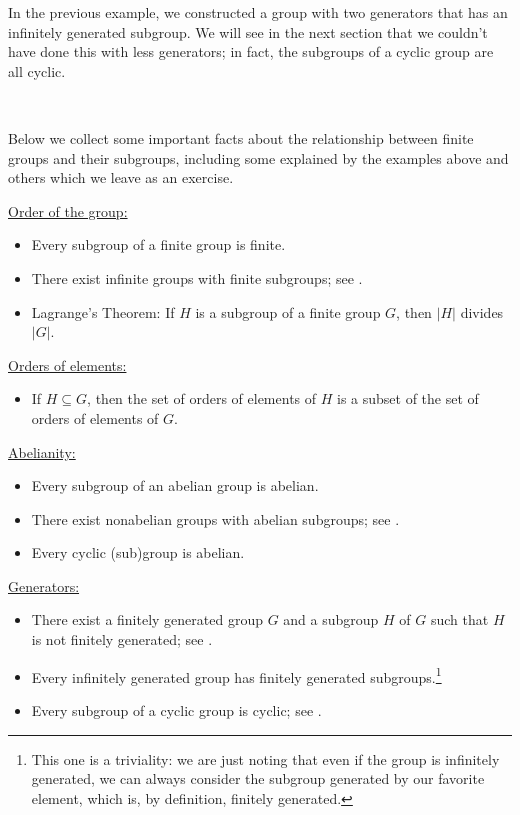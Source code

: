 \documentclass[12pt]{report}
\numberwithin{equation}{section}
\numberwithin{theorem}{chapter}
\theoremstyle{definition}
\newtheorem*{basic properties}{Basic Properties}
\newtheorem*{Important Remark}{Important Remark}
\begin{document}
In the previous example, we constructed a group with two generators that has an infinitely generated subgroup. We will see in the next section that we couldn't have done this with less generators; in fact, the subgroups of a cyclic group are all cyclic.


\


Below we collect some important facts about the relationship between finite groups and their subgroups, including some explained by the examples above and others which we leave as an exercise.


\vspace{0.5em}

\underline{Order of the group:}
\vspace{-0.3em}
\begin{itemize}[itemsep=-0.2em]
\item Every subgroup of a finite group is finite.
\item There exist infinite groups with finite subgroups; see .
\item Lagrange's Theorem: If $H$ is a subgroup of a finite group $G$, then $|H|$ divides $|G|$.
\end{itemize}

\underline{Orders of elements:}
\vspace{-0.3em}
\begin{itemize}
\item  If $H \subseteq G$, then the set of orders of elements of $H$ is a subset of the set of orders of elements of $G$.
\end{itemize}

\underline{Abelianity:}
\vspace{-0.3em}
\begin{itemize}[itemsep=-0.2em]
\item Every subgroup of an abelian group is abelian. 
\item There exist nonabelian groups with abelian subgroups; see .
\item Every cyclic (sub)group is abelian.
\end{itemize}

\underline{Generators:}
\vspace{-0.3em}
\begin{itemize}[itemsep=-0.2em]
\item There exist a finitely generated group $G$ and a subgroup $H$ of $G$ such that $H$ is not finitely generated; see .
\item Every infinitely generated group has finitely generated subgroups.\footnote{This one is a triviality: we are just noting that even if the group is infinitely generated, we can always consider the subgroup generated by our favorite element, which is, by definition, finitely generated.}
\item Every subgroup of a cyclic group is cyclic; see . 
\end{itemize}
\end{document}

